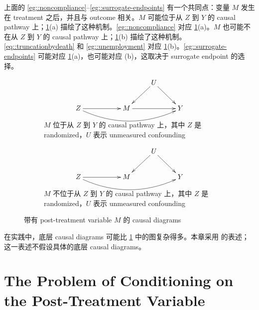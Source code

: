 上面的 \cref{eg::noncompliance}--\cref{eg::surrogate-endpoints} 有一个共同点：变量 $M$ 发生在 treatment 之后，并且与 outcome 相关。$M$ 可能位于从 $Z$ 到 $Y$ 的 causal pathway 上；\cref{fig::intermediate-diagram}(a) 描绘了这种机制。\cref{eg::noncompliance} 对应 \cref{fig::intermediate-diagram}(a)。$M$ 也可能不在从 $Z$ 到 $Y$ 的 causal pathway 上；\cref{fig::intermediate-diagram}(b) 描绘了这种机制。\cref{eq::truncationbydeath} 和 \cref{eg::unemployment} 对应 \cref{fig::intermediate-diagram}(b)。\cref{eg::surrogate-endpoints} 可能对应 \cref{fig::intermediate-diagram}(a)，也可能对应 (b)，这取决于 surrogate endpoint 的选择。

 


\begin{figure}[h]
\centering
\begin{subfigure}[]{\textwidth}
                \centering
$$
\begin{xy}
\xymatrix{
&& & U \ar[dl]   \ar[dr] \\
Z \ar[rr] \ar@/_1.5pc/[rrrr] & & M\ar[rr] & & Y\\
}
\end{xy}
$$ 
               \caption{$M$ 位于从 $Z$ 到 $Y$ 的 causal pathway 上，其中 $Z$ 是 randomized，$U$ 表示 unmeasured confounding}
        \end{subfigure}%
        
        \begin{subfigure}[]{\textwidth}
                \centering
$$
\begin{xy}
\xymatrix{
&& & U \ar[dl]   \ar[dr] \\
Z \ar[rr] \ar@/_1.5pc/[rrrr] & & M  & & Y\\
}
\end{xy}
$$
                \caption{$M$ 不位于从 $Z$ 到 $Y$ 的 causal pathway 上，其中 $Z$ 是 randomized，$U$ 表示 unmeasured confounding}
        \end{subfigure}%
        
\caption{带有 post-treatment variable $M$ 的 causal diagrams}\label{fig::intermediate-diagram}
\end{figure}


在实践中，底层 causal diagrams 可能比 \cref{fig::intermediate-diagram} 中的图复杂得多。本章采用 \citet{frangakis2002principal} 的表述；这一表述不假设具体的底层 causal diagrams。





\section{The Problem of Conditioning on the Post-Treatment Variable}


